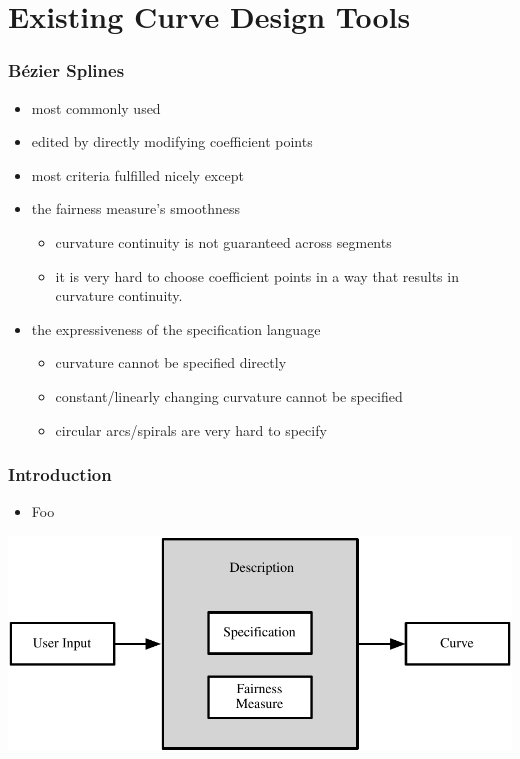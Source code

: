 \documentclass{beamer}
\begin{document}
	\section{Existing Curve Design Tools}
		\begin{frame}
			\frametitle{Bézier Splines}
			\begin{itemize}
				\item most commonly used
				\item edited by directly modifying coefficient points
				\item most criteria fulfilled nicely except
				\item the fairness measure's smoothness 
				\begin{itemize}
					\item curvature continuity is not guaranteed across segments
					\item it is very hard to choose coefficient points in a way that results in curvature continuity.
				\end{itemize}
				\item the expressiveness of the specification language
				\begin{itemize}
					\item curvature cannot be specified directly
					\item constant/linearly changing curvature cannot be specified
					\item circular arcs/spirals are very hard to specify
				\end{itemize}
			\end{itemize}
		\end{frame}
		
		\begin{frame}
			\frametitle{Introduction}
			\begin{itemize}
				\item Foo
			\end{itemize}
			\begin{centering}
				\includegraphics[width=\textwidth]{../resources/description-based_curves.pdf}\\
			\end{centering}
		\end{frame}
\end{document}
